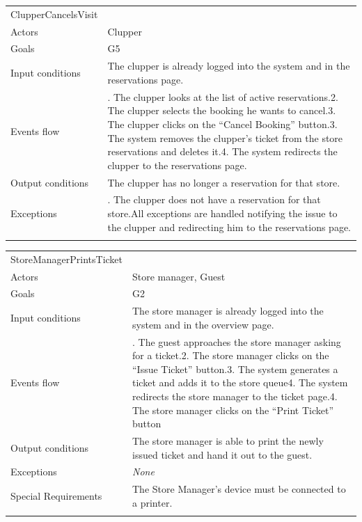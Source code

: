 \begin{longtable}[]{@{}
  >{\raggedright\arraybackslash}p{}
  >{\raggedright\arraybackslash}p{}@{}}
\toprule
ClupperCancelsVisit & \\ \addlinespace
\midrule
\endhead
Actors & Clupper \\ \addlinespace
Goals & G5 \\ \addlinespace
Input conditions & The clupper is already logged into the system and in
the reservations page. \\ \addlinespace
Events flow & 1. The clupper looks at the list of active reservations.2.
The clupper selects the booking he wants to cancel.3. The clupper clicks
on the ``Cancel Booking'' button.3. The system removes the clupper's
ticket from the store reservations and deletes it.4. The system
redirects the clupper to the reservations page. \\ \addlinespace
Output conditions & The clupper has no longer a reservation for that
store. \\ \addlinespace
Exceptions & 1. The clupper does not have a reservation for that
store.All exceptions are handled notifying the issue to the clupper and
redirecting him to the reservations page. \\ \addlinespace
\bottomrule
\end{longtable}

\begin{longtable}[]{@{}
  >{\raggedright\arraybackslash}p{}
  >{\raggedright\arraybackslash}p{}@{}}
\toprule
StoreManagerPrintsTicket & \\ \addlinespace
\midrule
\endhead
Actors & Store manager, Guest \\ \addlinespace
Goals & G2 \\ \addlinespace
Input conditions & The store manager is already logged into the system
and in the overview page. \\ \addlinespace
Events flow & 1. The guest approaches the store manager asking for a
ticket.2. The store manager clicks on the ``Issue Ticket'' button.3. The
system generates a ticket and adds it to the store queue4. The system
redirects the store manager to the ticket page.4. The store manager
clicks on the ``Print Ticket'' button \\ \addlinespace
Output conditions & The store manager is able to print the newly issued
ticket and hand it out to the guest. \\ \addlinespace
Exceptions & \emph{None} \\ \addlinespace
Special Requirements & The Store Manager's device must be connected to a
printer. \\ \addlinespace
\bottomrule
\end{longtable}

